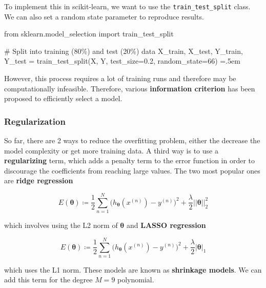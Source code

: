 \documentclass{article}
\theoremstyle{definition}
\newenvironment{cverbatim}
    {\SaveVerbatim{cverb}}
    {\endSaveVerbatim
    \flushleft\fboxrule=0pt\fboxsep=.5em
    \colorbox{cverbbg}{%
      \makebox[\dimexpr\linewidth-2\fboxsep][l]{\BUseVerbatim{cverb}}%
    }
    \endflushleft
  }
\begin{document}
      To implement this in scikit-learn, we want to use the \texttt{train\_test\_split} class. We can also set a random state parameter to reproduce results. 

      \begin{cverbatim}
      from sklearn.model_selection import train_test_split 

      # Split into training (80\%) and test (20\%) data 
      X_train, X_test, Y_train, Y_test = train_test_split(X, Y, test_size=0.2, 
                                                          random_state=66)
      \end{cverbatim}

      However, this process requires a lot of training runs and therefore may be computationally infeasible. Therefore, various \textbf{information criterion} has been proposed to efficiently select a model. 


    \subsubsection{Regularization}

      So far, there are 2 ways to reduce the overfitting problem, either the decrease the model complexity or get more training data. A third way is to use a \textbf{regularizing} term, which adds a penalty term to the error function in order to discourage the coefficients from reaching large values. The two most popular ones are \textbf{ridge regression} 

      \[E(\boldsymbol{\theta}) \coloneqq \frac{1}{2} \sum_{n=1}^N \big( h_{\boldsymbol{\theta}} (x^{(n)}) - y^{(n)} \big)^2 + \frac{\lambda}{2} ||\boldsymbol{\theta}||_2^2\]

      which involves using the L2 norm of $\boldsymbol{\theta}$ and \textbf{LASSO regression} 

      \[E(\boldsymbol{\theta}) \coloneqq \frac{1}{2} \sum_{n=1}^N \big( h_{\boldsymbol{\theta}} (x^{(n)}) - y^{(n)} \big)^2 + \frac{\lambda}{2} |\boldsymbol{\theta}|_1\]

      which uses the L1 norm. These models are known as \textbf{shrinkage models}. We can add this term for the degree $M=9$ polynomial. 
\end{document}
